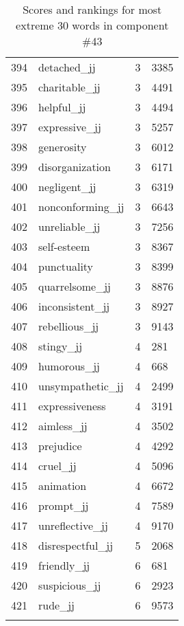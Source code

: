 \begin{longtable}[!htbp]{| rlr@{.}l |}
    394 & detached\_jj & 3 & 3385 \\
    395 & charitable\_jj & 3 & 4491 \\
    396 & helpful\_jj & 3 & 4494 \\
    397 & expressive\_jj & 3 & 5257 \\
    398 & generosity & 3 & 6012 \\
    399 & disorganization & 3 & 6171 \\
    400 & negligent\_jj & 3 & 6319 \\
    401 & nonconforming\_jj & 3 & 6643 \\
    402 & unreliable\_jj & 3 & 7256 \\
    403 & self-esteem & 3 & 8367 \\
    404 & punctuality & 3 & 8399 \\
    405 & quarrelsome\_jj & 3 & 8876 \\
    406 & inconsistent\_jj & 3 & 8927 \\
    407 & rebellious\_jj & 3 & 9143 \\
    408 & stingy\_jj & 4 & 281 \\
    409 & humorous\_jj & 4 & 668 \\
    410 & unsympathetic\_jj & 4 & 2499 \\
    411 & expressiveness & 4 & 3191 \\
    412 & aimless\_jj & 4 & 3502 \\
    413 & prejudice & 4 & 4292 \\
    414 & cruel\_jj & 4 & 5096 \\
    415 & animation & 4 & 6672 \\
    416 & prompt\_jj & 4 & 7589 \\
    417 & unreflective\_jj & 4 & 9170 \\
    418 & disrespectful\_jj & 5 & 2068 \\
    419 & friendly\_jj & 6 & 681 \\
    420 & suspicious\_jj & 6 & 2923 \\
    421 & rude\_jj & 6 & 9573 \\
    \hline
    \caption{Scores and rankings for most extreme 30 words in component \#43} \\
\end{longtable}
